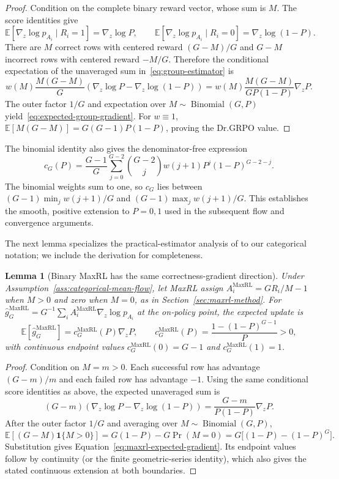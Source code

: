 \documentclass{article}
\newcommand{\1}{\mathbf 1}
\newcommand{\E}{\mathbb E}
\newtheorem{lemma}{Lemma}[section]
\theoremstyle{remark}
\theoremstyle{definition}
\theoremstyle{plain}
\begin{document}
\begin{proof}
Condition on the complete binary reward vector, whose sum is $M$. The score
identities give
\[
  \E[\nabla_z\log p_{A_i}\mid R_i=1]=\nabla_z\log P,
  \qquad
  \E[\nabla_z\log p_{A_i}\mid R_i=0]
  =\nabla_z\log(1-P).
\]
There are $M$ correct rows with centered reward $(G-M)/G$ and $G-M$
incorrect rows with centered reward $-M/G$. Therefore the conditional
expectation of the unaveraged sum in~\eqref{eq:group-estimator} is
\[
  w(M)\frac{M(G-M)}{G}
  \left(\nabla_z\log P-\nabla_z\log(1-P)\right)
  =w(M)\frac{M(G-M)}{GP(1-P)}\nabla_zP.
\]
The outer factor $1/G$ and expectation over
$M\sim\operatorname{Binomial}(G,P)$ yield~\eqref{eq:expected-group-gradient}.
For $w\equiv1$,
$\E[M(G-M)]=G(G-1)P(1-P)$, proving the Dr.GRPO value.
\end{proof}

The binomial identity also gives the denominator-free expression
\[
 c_G(P)=\frac{G-1}{G}\sum_{j=0}^{G-2}\binom{G-2}{j}
 w(j+1)P^j(1-P)^{G-2-j}.
\]
The binomial weights sum to one, so $c_G$ lies between
$(G-1)\min_j w(j+1)/G$ and $(G-1)\max_j w(j+1)/G$.
This establishes the smooth, positive extension to $P=0,1$ used in the
subsequent flow and convergence arguments.

The next lemma specializes the practical-estimator analysis of
\citet[Section~4.3 and App.~D, Theorem~5]{tajwar2026maxrl}
to our categorical notation; we include the derivation for completeness.

\begin{lemma}[Binary MaxRL has the same correctness-gradient direction]
\label{lem:maxrl-mean}
Under Assumption~\ref{ass:categorical-mean-flow}, let MaxRL assign
$A_i^{\mathrm{MaxRL}}=GR_i/M-1$ when $M>0$ and zero when $M=0$, as in
Section~\ref{sec:maxrl-method}. For
$\widehat g_G^{\mathrm{MaxRL}}=G^{-1}\sum_i
 A_i^{\mathrm{MaxRL}}\nabla_z\log p_{A_i}$ at the on-policy point, the
expected update is
\begin{equation}
  \E[\widehat g_G^{\mathrm{MaxRL}}]
  =c_G^{\mathrm{MaxRL}}(P)\nabla_zP,
  \qquad
  c_G^{\mathrm{MaxRL}}(P)
  =\frac{1-(1-P)^{G-1}}{P}>0,
  \label{eq:maxrl-expected-gradient}
\end{equation}
with continuous endpoint values
$c_G^{\mathrm{MaxRL}}(0)=G-1$ and
$c_G^{\mathrm{MaxRL}}(1)=1$.
\end{lemma}

\begin{proof}
Condition on $M=m>0$. Each successful row has advantage $(G-m)/m$ and each
failed row has advantage $-1$. Using the same conditional score identities as
above, the expected unaveraged sum is
\[
  (G-m)\!\left(\nabla_z\log P-\nabla_z\log(1-P)\right)
  =\frac{G-m}{P(1-P)}\nabla_zP.
\]
After the outer factor $1/G$ and averaging over
$M\sim\operatorname{Binomial}(G,P)$,
\[
 \E[(G-M)\1\{M>0\}]
 =G(1-P)-G\Pr(M=0)
 =G\big[(1-P)-(1-P)^G\big].
\]
Substitution gives Equation~\eqref{eq:maxrl-expected-gradient}. Its endpoint
values follow by continuity (or the finite geometric-series identity), which
also gives the stated continuous extension at both boundaries.
\end{proof}
\end{document}
